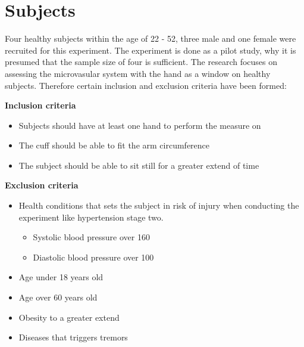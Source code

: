 \section{Subjects}

Four healthy subjects within the age of 22 - 52, three male and one female were recruited for this experiment. The experiment is done as a pilot study, why it is presumed that the sample size of four is sufficient. The research focuses on assessing the microvasular system with the hand as a window on healthy subjects. Therefore certain inclusion and exclusion criteria have been formed:

\textbf{Inclusion criteria}
\begin{itemize}[noitemsep]
	\item Subjects should have at least one hand to perform the measure on
	\item The cuff should be able to fit the arm circumference 
	\item The subject should be able to sit still for a greater extend of time
\end{itemize}

\textbf{Exclusion criteria}
\begin{itemize}[noitemsep]
	\item Health conditions that sets the subject in risk of injury when conducting the experiment like hypertension stage two.
	\begin{itemize}
		\item Systolic blood pressure over 160
		\item Diastolic blood pressure over 100
	\end{itemize}	
	\item Age under 18 years old
	\item Age over 60 years old
	\item Obesity to a greater extend
	\item Diseases that triggers tremors   
\end{itemize} 
